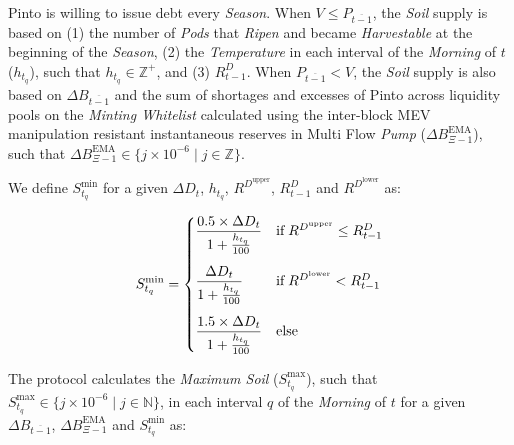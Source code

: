 \documentclass[tikz]{article}
\newcommand{\term}[1]{\textsl{#1}}
\begin{document}
Pinto is willing to issue debt every \term{Season}. When $V \leq P_{\overline{t-1}}$, the \term{Soil} supply is based on (1) the number of \term{Pods} that \term{Ripen} and became \term{Harvestable} at the beginning of the \term{Season}, (2) the \term{Temperature} in each interval of the \term{Morning} of $t$ ($h_{t_{q}}$), such that $h_{t_{q}} \in \mathbb{Z}^{+}$, and (3) $R_{t-1}^{D}$. When $P_{\overline{t-1}} < V$, the \term{Soil} supply is also based on $\Delta B_{\overline{t-1}}$ and the sum of shortages and excesses of Pinto across liquidity pools on the \term{Minting Whitelist} calculated using the inter-block MEV manipulation resistant instantaneous reserves in Multi Flow \term{Pump} ($\Delta B_{\Xi-1}^{\text{EMA}}$), such that $\Delta B_{\Xi-1}^{\text{EMA}} \in \{j \times 10^{-6} \mid j \in \mathbb{Z} \}$.

We define $S_{t_{q}}^{\text{min}}$ for a given $\Delta D_{t}$, $h_{t_{q}}$, $R^{D^{\text{upper}}}$, $R_{t-1}^{D}$ and $R^{D^{\text{lower}}}$ as:

\vspace*{2mm}

    $$
        S_{t_{q}}^{\text{min}} = 
            \begin{cases} 
                \dfrac{0.5 \times \Delta D_{t}}
                        {1 + \frac{h_{t_{q}}}
                                    {100}}
                    & \text{if} \; R^{D^{\text{upper}}} \leq R_{t-1}^{D} \vspace{.3cm} \\ 
                    
                \dfrac{\Delta D_{t}}
                        {1 + \frac{h_{t_{q}}}
                                    {100}} 
                    & \text{if} \; R^{D^{\text{lower}}} < R_{t-1}^{D} \vspace{.3cm} \\ 
                    
                \dfrac{1.5 \times \Delta D_{t}}
                        {1 + \frac{h_{t_{q}}}
                                    {100}} 
                    & \text{else} 
            \end{cases}
    $$

\vspace*{2mm}

The protocol calculates the \term{Maximum Soil} ($S_{t_{q}}^{\text{max}}$), such that $S_{t_{q}}^{\text{max}} \in \{j \times 10^{-6} \mid j \in \mathbb{N} \}$, in each interval $q$ of the \term{Morning} of $t$ for a given $\Delta B_{\overline{t-1}}$, $\Delta B_{\Xi-1}^{\text{EMA}}$ and $S_{t_{q}}^{\text{min}}$ as:
\end{document}
